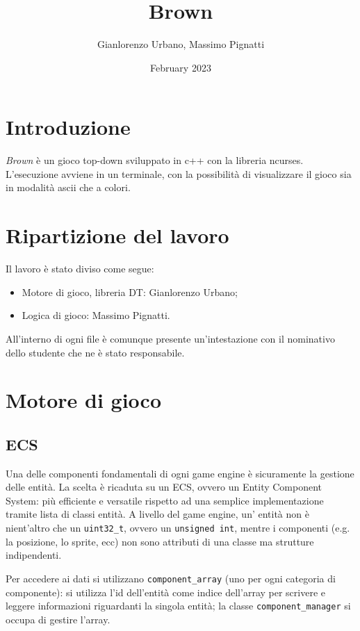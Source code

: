 \documentclass{article}
\title{Brown}
\author{Gianlorenzo Urbano, Massimo Pignatti}
\date{February 2023}
\begin{document}
\maketitle

\section{Introduzione}

\emph{Brown} è un gioco top-down sviluppato in c++ con la libreria ncurses. L'esecuzione avviene in un terminale, con la possibilità di visualizzare il gioco sia in modalità ascii che a colori.

\section{Ripartizione del lavoro}
Il lavoro è stato diviso come segue:
\begin{itemize}
    \item Motore di gioco, libreria DT: Gianlorenzo Urbano;
    \item Logica di gioco: Massimo Pignatti.
\end{itemize}
All'interno di ogni file è comunque presente un'intestazione con il nominativo dello studente che ne è stato responsabile.

\section{Motore di gioco}

\subsection{ECS}
Una delle componenti fondamentali di ogni game engine è sicuramente la gestione delle entità.
La scelta è ricaduta su un ECS, ovvero un Entity Component System: più efficiente e versatile rispetto ad una semplice implementazione tramite lista di classi entità.
A livello del game engine, un' entità non è nient'altro che un \verb|uint32_t|, ovvero un \verb|unsigned int|, mentre i componenti (e.g. la posizione, lo sprite, ecc) non sono attributi di una classe ma strutture indipendenti.

Per accedere ai dati si utilizzano \verb|component_array| (uno per ogni categoria di componente): si utilizza l'id dell'entità come indice dell'array per scrivere e leggere informazioni riguardanti la singola entità; la classe \verb!component_manager! si occupa di gestire l'array.
\end{document}
